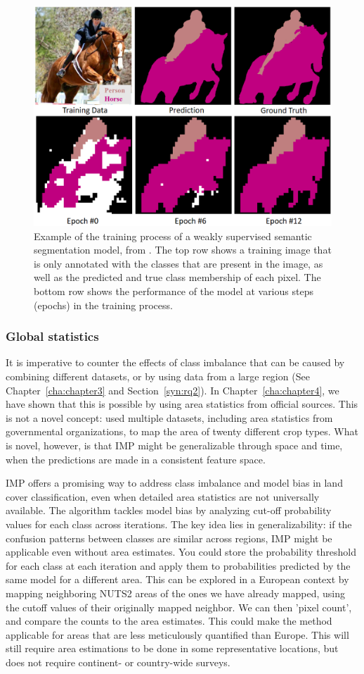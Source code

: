             \begin{figure}[H]
            \centering
            \includegraphics[width=0.5\linewidth]{figs_06/huang_person_horse.png}
            \caption{Example of the training process of a weakly supervised semantic segmentation model, from \citet{huang2018weaklysupervised}. The top row shows a training image that is only annotated with the classes that are present in the image, as well as the predicted and true class membership of each pixel. The bottom row shows the performance of the model at various steps (epochs) in the training process.}
            \label{fig:weaklysupervised}
            \end{figure}

        \subsubsection{Global statistics}

        It is imperative to counter the effects of class imbalance that can be caused by combining different datasets, or by using data from a large region (See Chapter\@~\ref{cha:chapter3} and Section\@~\ref{syn:rq2}). In Chapter\@~\ref{cha:chapter4}, we have shown that this is possible by using area statistics from official sources. This is not a novel concept: \citet{you2014generating} used multiple datasets, including area statistics from governmental organizations, to map the area of twenty different crop types. What is novel, however, is that IMP might be generalizable through space and time, when the predictions are made in a consistent feature space.

        IMP offers a promising way to address class imbalance and model bias in land cover classification, even when detailed area statistics are not universally available. The algorithm tackles model bias by analyzing cut-off probability values for each class across iterations. The key idea lies in generalizability: if the confusion patterns between classes are similar across regions, IMP might be applicable even without area estimates. You could store the probability threshold for each class at each iteration and apply them to probabilities predicted by the same model for a different area. This can be explored in a European context by mapping neighboring NUTS2 areas of the ones we have already mapped, using the cutoff values of their originally mapped neighbor. We can then 'pixel count', and compare the counts to the area estimates. This could make the method applicable for areas that are less meticulously quantified than Europe. This will still require area estimations to be done in some representative locations, but does not require continent- or country-wide surveys. 
        
